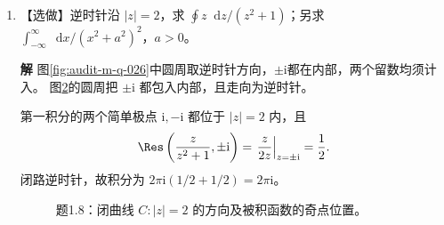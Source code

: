 \documentclass[11pt,openany,fontset=fandol]{ctexbook}
\theoremstyle{plain}\newtheorem{theorem}{定理}[chapter]\newtheorem{proposition}[theorem]{命题}
\theoremstyle{definition}\newtheorem{definition}{定义}[chapter]\newtheorem{example}{例}[chapter]
\theoremstyle{remark}\newtheorem*{remark}{说明}
\newcommand{\SolutionStart}{\par\nobreak\medskip\nobreak\noindent\textbf{解}\quad\ignorespaces}
\newenvironment{solution}{\SolutionStart}{\par\medskip}
\newcommand{\dd}{\mathop{}\!\mathrm d}\newcommand{\ii}{\mathrm i}\newcommand{\ee}{\mathrm e}
\begin{document}
\begin{enumerate}[label=1.\arabic*]
\begin{solution}
令 $u=x^2,v=y^2$。四个偏导为 $u_x=2x,u_y=0,v_x=0,v_y=2y$，柯西--黎曼条件是
\[
u_x=v_y,\quad u_y=-v_x
\quad\Longleftrightarrow\quad x=y.
\]
偏导处处连续，故这条直线上的每一点都复可导，且 $f'=u_x+\ii v_x=2x$；直线外不复可导。

\begin{figure}[H]\centering
{}
\caption{题1.7解图：可导点集是一条直线，不包含任何开圆盘，因此不能构成解析区域。}\label{fig:hw-1-7}
\end{figure}

还可在 $z_0=x_0+\ii x_0$ 处直接展开。增量 $h=\xi+\ii\eta$ 满足
\[
f(z_0+h)-f(z_0)=2x_0h+\xi^2+\ii\eta^2.
\]
最后一项的模不超过 $|h|^2$，除以 $h$ 后趋零，因此导数确为 $2x_0$。可导点集是一条线，没有非空开内部，所以不存在解析的非空开区域。

图中以任意直线点为圆心画小圆，总有圆内点不在直线上；因此找不到全部可导的开邻域。
\end{solution}

\item \begin{minipage}[t]{\linewidth}
【选做】逆时针沿 $|z|=2$，求 $\oint z\dd z/(z^2+1)$；另求 $\int_{-\infty}^{\infty}\dd x/(x^2+a^2)^2$，$a>0$。

\end{minipage}

\begin{solution}
图\ref{fig:audit-m-q-026}中圆周取逆时针方向，$\pm\ii$都在内部，两个留数均须计入。
图\ref{fig:ex-1-8}的圆周把 $\pm\ii$ 都包入内部，且走向为逆时针。

第一积分的两个简单极点 $\ii,-\ii$ 都位于 $|z|=2$ 内，且
\[
\Res\left(\frac z{z^2+1},\pm\ii\right)
=\left.\frac z{2z}\right|_{z=\pm\ii}=\frac12.
\]
闭路逆时针，故积分为 $2\pi\ii(1/2+1/2)=2\pi\ii$。

\begin{figure}[H]\centering
{}
\caption{题1.8：闭曲线 $C:|z|=2$ 的方向及被积函数的奇点位置。}\label{fig:ex-1-8}
\end{figure}


\end{solution}
\end{enumerate}
\end{document}
